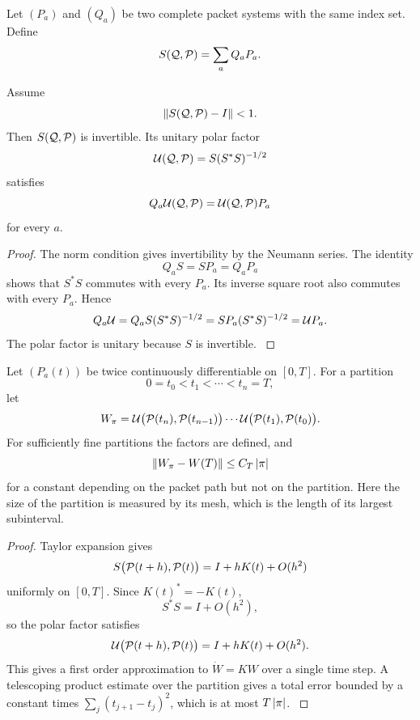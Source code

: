 Let \((P_a)\) and \((Q_a)\) be two complete packet systems with the same index set. Define
\[
S(\Qcal,\Pcal)=\sum_aQ_aP_a.
\]

\begin{theorem}\label{strong:theorem:016}\label{strong:thm:direct_rotation}
Assume
\[
\norm{S(\Qcal,\Pcal)-I}<1.
\]
Then \(S(\Qcal,\Pcal)\) is invertible. Its unitary polar factor
\[
\Ucal(\Qcal,\Pcal)
=
S(S^*S)^{-1/2}
\]
satisfies
\[
Q_a\Ucal(\Qcal,\Pcal)
=
\Ucal(\Qcal,\Pcal)P_a
\]
for every \(a\).
\end{theorem}

\begin{proof}\label{strong:proof:025}
The norm condition gives invertibility by the Neumann series. The identity
\[
Q_aS=SP_a=Q_aP_a
\]
shows that \(S^*S\) commutes with every \(P_a\). Its inverse square root also commutes with every \(P_a\). Hence
\[
Q_a\Ucal
=Q_aS(S^*S)^{-1/2}
=SP_a(S^*S)^{-1/2}
=\Ucal P_a.
\]
The polar factor is unitary because \(S\) is invertible.
\label{strong:proof:025:end}\end{proof}

\begin{theorem}\label{strong:theorem:017}\label{strong:thm:short_rotation_convergence}
Let \((P_a(t))\) be twice continuously differentiable on \([0,T]\). For a partition
\[
0=t_0<t_1<\cdots<t_n=T,
\]
let
\[
W_\pi
=
\Ucal\bigl(\Pcal(t_n),\Pcal(t_{n-1})\bigr)
\cdots
\Ucal\bigl(\Pcal(t_1),\Pcal(t_0)\bigr).
\]
For sufficiently fine partitions the factors are defined, and
\[
\left\lVert W_\pi-W(T)\right\rVert
\leq
C_T\left\lvert\pi\right\rvert
\]
for a constant depending on the packet path but not on the partition. Here the size of the partition is measured by its mesh, which is the length of its largest subinterval.
\end{theorem}

\begin{proof}\label{strong:proof:026}
Taylor expansion gives
\[
S\bigl(\Pcal(t+h),\Pcal(t)\bigr)
=
I+hK(t)+O(h^2)
\]
uniformly on \([0,T]\). Since \(K(t)^*=-K(t)\),
\[
S^*S=I+O(h^2),
\]
so the polar factor satisfies
\[
\Ucal\bigl(\Pcal(t+h),\Pcal(t)\bigr)
=
I+hK(t)+O(h^2).
\]
This gives a first order approximation to \(\dot W=KW\) over a single time step. A telescoping product estimate over the partition gives a total error bounded by a constant times \(\sum_j(t_{j+1}-t_j)^2\), which is at most \(T\left\lvert\pi\right\rvert\).
\label{strong:proof:026:end}\end{proof}

